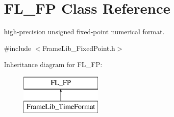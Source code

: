 \hypertarget{class_f_l___f_p}{}\section{F\+L\+\_\+\+FP Class Reference}
\label{class_f_l___f_p}


high-\/precision unsigned fixed-\/point numerical format.  




{\ttfamily \#include $<$Frame\+Lib\+\_\+\+Fixed\+Point.\+h$>$}

Inheritance diagram for F\+L\+\_\+\+FP\+:\begin{figure}[H]
\begin{center}
\leavevmode
\includegraphics[height=2.000000cm]{class_f_l___f_p}
\end{center}
\end{figure}
